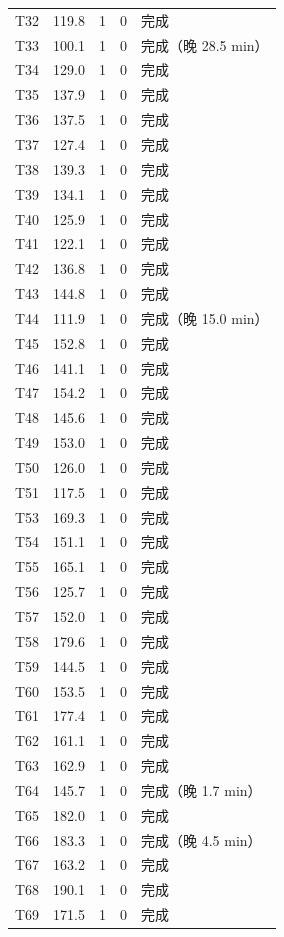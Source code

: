 \documentclass[a4paper,11pt]{article}
\begin{document}
\begin{table}[htbp]
\begin{tabular}{rcccl}
T32 & 119.8 & 1 & 0 & 完成 \\
T33 & 100.1 & 1 & 0 & 完成（晚 28.5 min） \\
T34 & 129.0 & 1 & 0 & 完成 \\
T35 & 137.9 & 1 & 0 & 完成 \\
T36 & 137.5 & 1 & 0 & 完成 \\
T37 & 127.4 & 1 & 0 & 完成 \\
T38 & 139.3 & 1 & 0 & 完成 \\
T39 & 134.1 & 1 & 0 & 完成 \\
T40 & 125.9 & 1 & 0 & 完成 \\
T41 & 122.1 & 1 & 0 & 完成 \\
T42 & 136.8 & 1 & 0 & 完成 \\
T43 & 144.8 & 1 & 0 & 完成 \\
T44 & 111.9 & 1 & 0 & 完成（晚 15.0 min） \\
T45 & 152.8 & 1 & 0 & 完成 \\
T46 & 141.1 & 1 & 0 & 完成 \\
T47 & 154.2 & 1 & 0 & 完成 \\
T48 & 145.6 & 1 & 0 & 完成 \\
T49 & 153.0 & 1 & 0 & 完成 \\
T50 & 126.0 & 1 & 0 & 完成 \\
T51 & 117.5 & 1 & 0 & 完成 \\
T53 & 169.3 & 1 & 0 & 完成 \\
T54 & 151.1 & 1 & 0 & 完成 \\
T55 & 165.1 & 1 & 0 & 完成 \\
T56 & 125.7 & 1 & 0 & 完成 \\
T57 & 152.0 & 1 & 0 & 完成 \\
T58 & 179.6 & 1 & 0 & 完成 \\
T59 & 144.5 & 1 & 0 & 完成 \\
T60 & 153.5 & 1 & 0 & 完成 \\
T61 & 177.4 & 1 & 0 & 完成 \\
T62 & 161.1 & 1 & 0 & 完成 \\
T63 & 162.9 & 1 & 0 & 完成 \\
T64 & 145.7 & 1 & 0 & 完成（晚 1.7 min） \\
T65 & 182.0 & 1 & 0 & 完成 \\
T66 & 183.3 & 1 & 0 & 完成（晚 4.5 min） \\
T67 & 163.2 & 1 & 0 & 完成 \\
T68 & 190.1 & 1 & 0 & 完成 \\
T69 & 171.5 & 1 & 0 & 完成 \\

\end{tabular}
\end{table}
\end{document}
